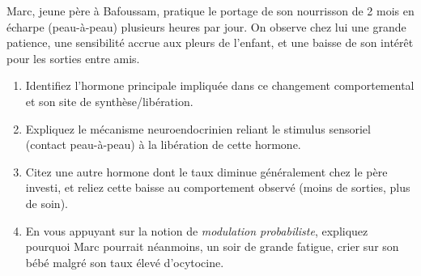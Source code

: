 \documentclass[11pt]{article}
\begin{document}
\begin{exercice}
Marc, jeune père à Bafoussam, pratique le portage de son nourrisson de 2 mois en écharpe (peau-à-peau) plusieurs heures par jour. On observe chez lui une grande patience, une sensibilité accrue aux pleurs de l'enfant, et une baisse de son intérêt pour les sorties entre amis.
\begin{enumerate}
    \item Identifiez l'hormone principale impliquée dans ce changement comportemental et son site de synthèse/libération.
    \item Expliquez le mécanisme neuroendocrinien reliant le stimulus sensoriel (contact peau-à-peau) à la libération de cette hormone.
    \item Citez une autre hormone dont le taux diminue généralement chez le père investi, et reliez cette baisse au comportement observé (moins de sorties, plus de soin).
    \item En vous appuyant sur la notion de \emph{modulation probabiliste}, expliquez pourquoi Marc pourrait néanmoins, un soir de grande fatigue, crier sur son bébé malgré son taux élevé d'ocytocine.
\end{enumerate}
\end{exercice}
\end{document}
